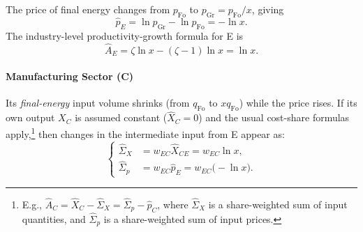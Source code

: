 \documentclass[11pt]{article}
\begin{document}
\noindent The price of final energy changes from $p_{\mathrm{Fo}}$ to $p_{\mathrm{Gr}} = p_{\mathrm{Fo}}/x$, giving
\begin{equation*}
     \hat{p}_E = \ln p_{\mathrm{Gr}} - \ln p_{\mathrm{Fo}}
                      = -\ln x.
\end{equation*}
\noindent The industry-level productivity-growth formula for E is
\begin{equation*}
     \hat{A}_E = \zeta \ln x - (\zeta - 1)\ln x 
                       = \ln x.
\end{equation*}

\paragraph{Manufacturing Sector (C)}
 Its \emph{final-energy} input volume shrinks (from $q_{\mathrm{Fo}}$ to $xq_{\mathrm{Fo}}$) while the price rises.  If its own output $X_C$ is assumed constant ($\hat{X}_C = 0$) and the usual cost-share formulas apply,\footnote{%
      E.g., $\hat{A}_C = \hat{X}_C - \hat{\Sigma}_X = \hat{\Sigma}_p - \hat{p}_C$, 
      where $\hat{\Sigma}_X$ is a share-weighted sum of input quantities, 
      and $\hat{\Sigma}_p$ is a share-weighted sum of input prices.}
      then changes in the intermediate input from E appear as:
  \begin{equation*}
    \left\{
    \begin{aligned}
        \hat{\Sigma}_X &= w_{EC}\hat{X}_{CE} 
                      = w_{EC}\ln x, \\
        \hat{\Sigma}_p &= w_{EC}\hat{p}_E
                      = w_{EC}\bigl(-\ln x\bigr).
    \end{aligned}
    \right.
\end{equation*}
\end{document}
